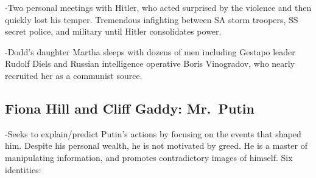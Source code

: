 \documentclass[
]{article}
\begin{document}
-Two personal meetings with Hitler, who acted surprised by the violence
and then quickly lost his temper. Tremendous infighting between SA storm
troopers, SS secret police, and military until Hitler consolidates
power.

-Dodd's daughter Martha sleeps with dozens of men including Gestapo
leader Rudolf Diels and Russian intelligence operative Boris Vinogradov,
who nearly recruited her as a communist source.

\hypertarget{fiona-hill-and-cliff-gaddy-mr.-putin}{%
\subsection{Fiona Hill and Cliff Gaddy:
Mr.~Putin}\label{fiona-hill-and-cliff-gaddy-mr.-putin}}

-Seeks to explain/predict Putin's actions by focusing on the events that
shaped him. Despite his personal wealth, he is not motivated by greed.
He is a master of manipulating information, and promotes contradictory
images of himself. Six identities:
\end{document}
